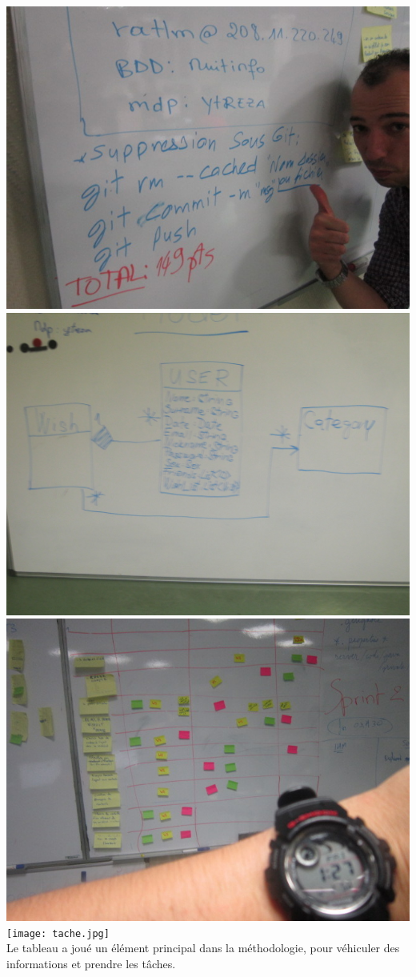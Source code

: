 \documentclass[a4paper,francais,titlepage]{article}
\begin{document}
    \includegraphics[scale=0.6]{gi.jpeg} \hspace{0.3cm} \includegraphics[scale=0.378]{shema.jpeg} \\
    
    \includegraphics[scale=0.6]{sprint.jpeg} \hspace{0.3cm} \texttt{[image: tache.jpg]} \\
    Le tableau a joué un élément principal dans la méthodologie, pour véhiculer des informations et prendre les tâches. \\
 
\end{document}
